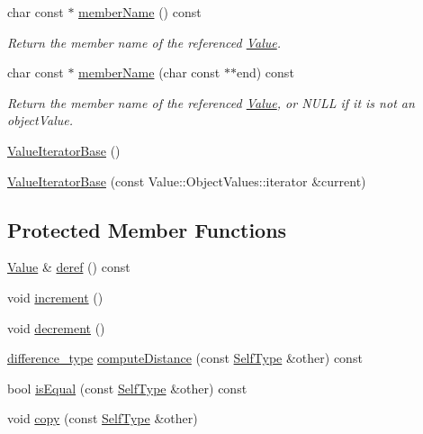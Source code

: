 \begin{DoxyCompactItemize}
char const $\ast$ \hyperlink{classJson_1_1ValueIteratorBase_ac3aa3870761342e47c6486d81f643c6c}{member\+Name} () const 
\begin{DoxyCompactList}\small\item\em Return the member name of the referenced \hyperlink{classJson_1_1Value}{Value}. \end{DoxyCompactList}\item 
char const $\ast$ \hyperlink{classJson_1_1ValueIteratorBase_a543d4e73e3d2d121bc287b24231386c3}{member\+Name} (char const $\ast$$\ast$end) const 
\begin{DoxyCompactList}\small\item\em Return the member name of the referenced \hyperlink{classJson_1_1Value}{Value}, or N\+U\+LL if it is not an object\+Value. \end{DoxyCompactList}\item 
\hyperlink{classJson_1_1ValueIteratorBase_af45b028d9ff9cbd2554a87878b42dd75}{Value\+Iterator\+Base} ()
\item 
\hyperlink{classJson_1_1ValueIteratorBase_a640e990e5f03a96fd650122a2906f59d}{Value\+Iterator\+Base} (const Value\+::\+Object\+Values\+::iterator \&current)
\end{DoxyCompactItemize}
\subsection*{Protected Member Functions}
\begin{DoxyCompactItemize}
\item 
\hyperlink{classJson_1_1Value}{Value} \& \hyperlink{classJson_1_1ValueIteratorBase_a40a20c65abc423a26e3aae68d9a0525c}{deref} () const 
\item 
void \hyperlink{classJson_1_1ValueIteratorBase_afe58f9534e1fd2033419fd9fe244551e}{increment} ()
\item 
void \hyperlink{classJson_1_1ValueIteratorBase_affc8cf5ff54a9f432cc693362c153fa6}{decrement} ()
\item 
\hyperlink{classJson_1_1ValueIteratorBase_a4e44bf8cbd17ec8d6e2c185904a15ebd}{difference\+\_\+type} \hyperlink{classJson_1_1ValueIteratorBase_ad6c553b249e89e3dc9933e100ccbe064}{compute\+Distance} (const \hyperlink{classJson_1_1ValueIteratorBase_a9d2a940d03ea06d20d972f41a89149ee}{Self\+Type} \&other) const 
\item 
bool \hyperlink{classJson_1_1ValueIteratorBase_a21820d6ee564e541bd118b21e4741962}{is\+Equal} (const \hyperlink{classJson_1_1ValueIteratorBase_a9d2a940d03ea06d20d972f41a89149ee}{Self\+Type} \&other) const 
\item 
void \hyperlink{classJson_1_1ValueIteratorBase_a496e6aba44808433ec5858c178be5719}{copy} (const \hyperlink{classJson_1_1ValueIteratorBase_a9d2a940d03ea06d20d972f41a89149ee}{Self\+Type} \&other)
\end{DoxyCompactItemize}
